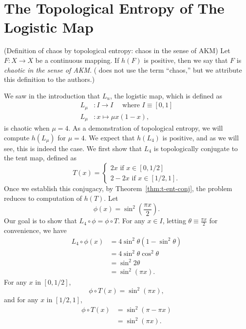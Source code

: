 \documentclass[12pt,twoside,draft]{book}
\begin{document}
\section{The Topological Entropy of The Logistic Map}
\begin{definition}
  (Definition of chaos by topological entropy: chaos in the sense of AKM) 
  Let $F: X \to X$ be a continuous mapping.
  If $h(F)$ is positive, then we say that $F$ is \textit{chaotic in the sense of AKM}.
  (\citet{akm} does not use the term ``chaos,'' but we attribute this definition to the authors.)
\end{definition}
We saw in the introduction that $L_u$, the logistic map, which is defined as
\begin{align*}
  L_\mu&: I \to I \quad\mbox{ where } I \equiv [0,1] \\
  L_\mu&: x \mapsto \mu x (1-x),
\end{align*}
is chaotic when $\mu = 4$.
As a demonstration of topological entropy, we will compute $h(L_\mu)$ for $\mu = 4$.
We expect that $h(L_4)$ is positive, and as we will see, this is indeed the case. 
We first show that $L_4$ is topologically conjugate to the tent map, defined as
\begin{equation*}
  T(x) = 
  \begin{cases}
    2x \mbox{ if } x \in [0,1/2] \\
    2 - 2x \mbox{ if } x \in [1/2,1].
  \end{cases}
\end{equation*}
Once we establish this conjugacy, by Theorem~\ref{thm:t-ent-conj}, the problem reduces to computation of $h(T)$.
Let
\begin{equation*}
  \phi(x) = \sin^2(\frac{\pi x}{2}).
\end{equation*}
Our goal is to show that $L_4 \circ \phi = \phi \circ T$.
For any $x \in I$, letting $\theta \equiv \frac{\pi x}{2}$ for convenience, we have
\begin{align*}
   L_4 \circ \phi(x)
   &= 4\sin^2\theta(1 - \sin^2\theta) \\
   &= 4\sin^2\theta \cos^2\theta \\
   &= \sin^2 2\theta \\
   &= \sin^2 (\pi x).
\end{align*}
For any $x$ in $[0,1/2]$,
\begin{equation*}
  \phi \circ T(x)
  = \sin^2(\pi x),
\end{equation*}
and for any $x$ in $[1/2,1]$,
\begin{align*}
  \phi \circ T(x)
  &= \sin^2(\pi - \pi x) \\
  &= \sin^2(\pi x).
\end{align*}
\end{document}
